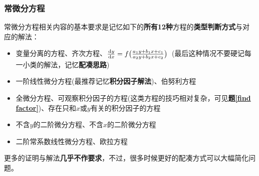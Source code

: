\documentclass[a4paper,UTF8,fontset=windows,AutoFakeBold]{ctexart}
\newcommand*{\dr}{\hspace{0.07em}\mathrm{d}}
\theoremstyle{ex}
\newcommand{\exref}[1]{\textbf{题\;\ref{#1}\;}}
\begin{document}
\subsubsection{常微分方程}
常微分方程相关内容的基本要求是记忆如下的\textbf{所有12种}方程的\textbf{类型判断方式}与对应的解法：
\begin{itemize}
    \item 变量分离的方程、齐次方程、$\frac{\dr y}{\dr x}=f\big(\frac{a_1y+b_1x+c_1}{a_2y+b_2x+c_2}\big)$\ (最后这种情况不要硬记每一小类的解法，记忆\textbf{配凑思路})
    \item 一阶线性微分方程(最推荐记忆\textbf{积分因子解法})、伯努利方程
    \item 全微分方程、可观察积分因子的方程(这类方程的技巧相对复杂，可见\exref{find factor})、存在只和$x$或$y$有关的积分因子的方程
    \item 不含$y$的二阶微分方程、不含$x$的二阶微分方程
    \item 二阶常系数线性微分方程、欧拉方程
\end{itemize}
更多的证明与解法\textbf{几乎不作要求}，不过，很多时候更好的配凑方式可以大幅简化问题。

\
\end{document}
